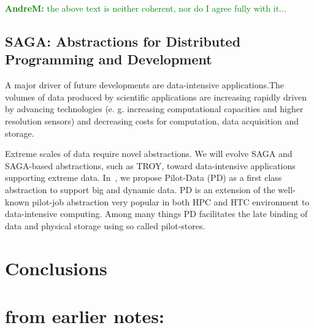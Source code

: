\documentclass{article}
\newcommand{\B}[1]{\textbf{#1}}
\newcommand{\amnote}[1]{{\textcolor{green}{   \B{AndreM:  } #1 }}}
\newcommand{\hknote}[1]{{\textcolor{red}{  \B{Hartmut: } #1 }}}
\newcommand{\amnote}[1]{}
\newcommand{\hknote}[1]{}
\begin{document}

  \amnote{the above text is neither coherent, nor do I agree fully with
  it...}


 \subsection{SAGA: Abstractions for Distributed Programming and
 Development}


A major driver of future developments are data-intensive applications.The
volumes of data produced by scientific applications are increasing
rapidly driven by advancing technologies (e. g. increasing computational
capacities and higher resolution sensors) and decreasing costs for
computation, data acquisition and storage.

Extreme scales of data require novel abstractions. We will evolve SAGA
and SAGA-based abstractions, such as TROY, toward data-intensive
applications supporting extreme data. In~\cite{troy-2011}, we propose
Pilot-Data (PD) as a first class abstraction to support big and dynamic
data. PD is an extension of the well-known pilot-job abstraction very
popular in both HPC and HTC environment to data-intensive computing.
Among many things PD facilitates the late binding of data and physical
storage using so called pilot-stores.

\section{Conclusions}




\label{sec:sum}






\newpage

\section{\B{from earlier notes:}}
\end{document}
